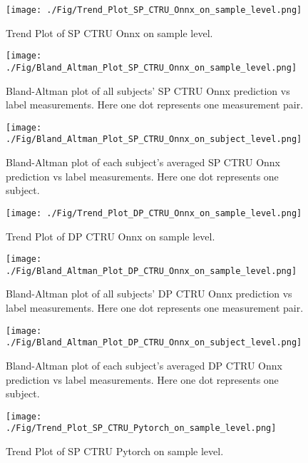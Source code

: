 \documentclass{article}
\begin{document}
\begin{figure}[H]
\centering
\texttt{[image: ./Fig/Trend\_Plot\_SP\_CTRU\_Onnx\_on\_sample\_level.png]}
\caption{Trend Plot of SP CTRU Onnx on sample level.}
\label{fig:image1}
\end{figure}

\begin{figure}[H]
\centering
\texttt{[image: ./Fig/Bland\_Altman\_Plot\_SP\_CTRU\_Onnx\_on\_sample\_level.png]}
\caption{Bland-Altman plot of all subjects' SP CTRU Onnx prediction vs label measurements. Here one dot represents one measurement pair.}
\label{fig:image1}
\end{figure}

\begin{figure}[H]
\centering
\texttt{[image: ./Fig/Bland\_Altman\_Plot\_SP\_CTRU\_Onnx\_on\_subject\_level.png]}
\caption{Bland-Altman plot of each subject's averaged SP CTRU Onnx prediction vs label measurements. Here one dot represents one subject.}
\label{fig:image1}
\end{figure}

\begin{figure}[H]
\centering
\texttt{[image: ./Fig/Trend\_Plot\_DP\_CTRU\_Onnx\_on\_sample\_level.png]}
\caption{Trend Plot of DP CTRU Onnx on sample level.}
\label{fig:image1}
\end{figure}

\begin{figure}[H]
\centering
\texttt{[image: ./Fig/Bland\_Altman\_Plot\_DP\_CTRU\_Onnx\_on\_sample\_level.png]}
\caption{Bland-Altman plot of all subjects' DP CTRU Onnx prediction vs label measurements. Here one dot represents one measurement pair.}
\label{fig:image1}
\end{figure}

\begin{figure}[H]
\centering
\texttt{[image: ./Fig/Bland\_Altman\_Plot\_DP\_CTRU\_Onnx\_on\_subject\_level.png]}
\caption{Bland-Altman plot of each subject's averaged DP CTRU Onnx prediction vs label measurements. Here one dot represents one subject.}
\label{fig:image1}
\end{figure}

\begin{figure}[H]
\centering
\texttt{[image: ./Fig/Trend\_Plot\_SP\_CTRU\_Pytorch\_on\_sample\_level.png]}
\caption{Trend Plot of SP CTRU Pytorch on sample level.}
\label{fig:image1}
\end{figure}
\end{document}
